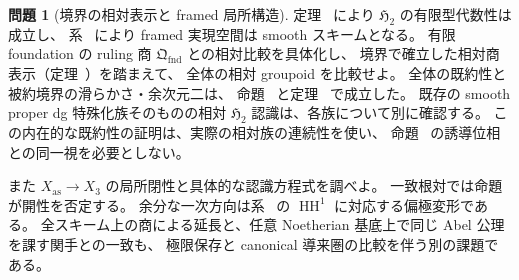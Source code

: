 \documentclass[a4paper,11pt]{ltjsarticle}
\numberwithin{equation}{section}
\theoremstyle{plain}
\theoremstyle{definition}
\newtheorem{problem}[theorem]{問題}
\theoremstyle{remark}
\newcommand{\HHstack}{\mathfrak H_2}
\begin{document}
\begin{problem}[境界の相対表示と framed 局所構造]
定理~\cite[\texttt{thm:global-h2-smooth-finite-type}]{QuadricModuli2026} により $\HHstack$ の有限型代数性は成立し、
系~\cite[\texttt{cor:global-xas-smooth-scheme}]{QuadricModuli2026} により framed 実現空間は smooth スキームとなる。
有限 foundation の ruling 商 $\mathfrak Q_{\mathrm{fnd}}$ との相対比較を具体化し、
境界で確立した相対商表示（定理~\cite[\texttt{thm:noncubic-intrinsic-presentation-equivalence}]{QuadricModuli2026}）を踏まえて、
全体の相対 groupoid を比較せよ。
全体の既約性と被約境界の滑らかさ・余次元二は、
命題~\cite[\texttt{prop:global-h2-irreducible}]{QuadricModuli2026} と定理~\cite[\texttt{thm:noncubic-boundary-smooth-codim-two}]{QuadricModuli2026} で成立した。
既存の smooth proper dg 特殊化族そのものの相対 $\HHstack$ 認識は、各族について別に確認する。
この内在的な既約性の証明は、実際の相対族の連続性を使い、
命題~\cite[\texttt{prop:h2-component-density}]{QuadricModuli2026} の誘導位相との同一視を必要としない。

また $X_{\mathrm{as}}\to X_3$ の局所閉性と具体的な認識方程式を調べよ。
一致根対では命題~\cite[\texttt{prop:global-h2-not-ambient-open}]{QuadricModuli2026} が開性を否定する。
余分な一次方向は系~\cite[\texttt{cor:artin-polarization-retraction}]{QuadricModuli2026} の
$\operatorname{HH}^1$ に対応する偏極変形である。
全スキーム上の商による延長と、任意 Noetherian 基底上で同じ Abel 公理を課す関手との一致も、
極限保存と canonical 導来圏の比較を伴う別の課題である。
\end{problem}



\end{document}

